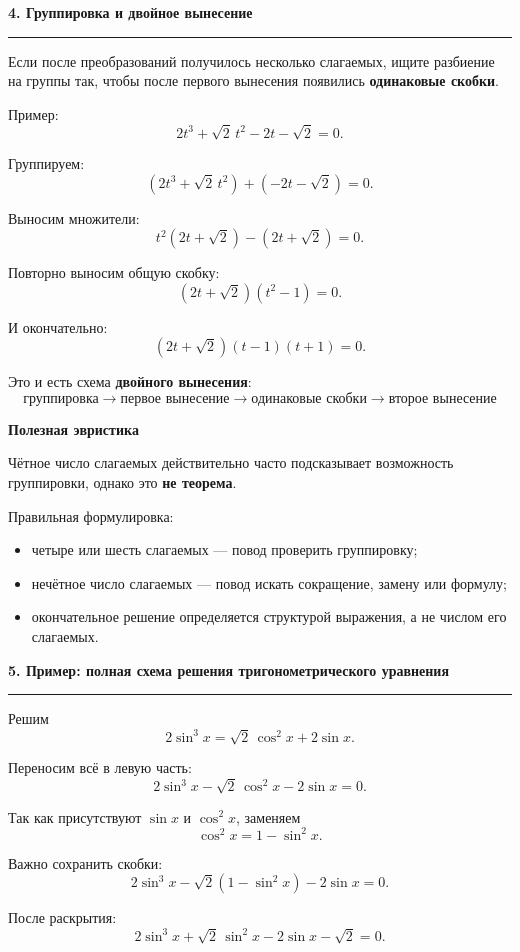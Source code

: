 \documentclass[a4paper,12pt]{article}
\newcommand{\checktitle}[1]{%
    \vspace{0.4em}
    {\Large\bfseries\textcolor{darkaccent}{#1}}\par
    \vspace{0.25em}
    {\color{accent!55}\rule{\linewidth}{0.6pt}}
    \vspace{0.45em}
}
\newcommand{\subcheck}[1]{%
    \vspace{0.25em}
    {\large\bfseries\textcolor{accent}{#1}}\par
    \vspace{0.15em}
}
\newcommand{\important}[1]{\textbf{\textcolor{darkaccent}{#1}}}
\begin{document}
\checktitle{4. Группировка и двойное вынесение}

Если после преобразований получилось несколько слагаемых, ищите разбиение на группы так, чтобы после первого вынесения появились \important{одинаковые скобки}.

Пример:
\[
    2t^3+\sqrt2\,t^2-2t-\sqrt2=0.
\]

Группируем:
\[
    \left(2t^3+\sqrt2\,t^2\right)
    +
    \left(-2t-\sqrt2\right)=0.
\]

Выносим множители:
\[
    t^2(2t+\sqrt2)-(2t+\sqrt2)=0.
\]

Повторно выносим общую скобку:
\[
    (2t+\sqrt2)(t^2-1)=0.
\]

И окончательно:
\[
    (2t+\sqrt2)(t-1)(t+1)=0.
\]

Это и есть схема \important{двойного вынесения}:
\[
\boxed{
\text{группировка}
\to
\text{первое вынесение}
\to
\text{одинаковые скобки}
\to
\text{второе вынесение}
}
\]

\subcheck{Полезная эвристика}

Чётное число слагаемых действительно часто подсказывает возможность группировки, однако это \important{не теорема}.

Правильная формулировка:

\begin{itemize}
    \item четыре или шесть слагаемых --- повод проверить группировку;
    \item нечётное число слагаемых --- повод искать сокращение, замену или формулу;
    \item окончательное решение определяется структурой выражения, а не числом его слагаемых.
\end{itemize}


\checktitle{5. Пример: полная схема решения тригонометрического уравнения}

Решим
\[
    2\sin^3x
    =
    \sqrt2\,\cos^2x+2\sin x.
\]

Переносим всё в левую часть:
\[
    2\sin^3x-\sqrt2\,\cos^2x-2\sin x=0.
\]

Так как присутствуют \(\sin x\) и \(\cos^2x\), заменяем
\[
    \cos^2x=1-\sin^2x.
\]

Важно сохранить скобки:
\[
    2\sin^3x-\sqrt2(1-\sin^2x)-2\sin x=0.
\]

После раскрытия:
\[
    2\sin^3x+\sqrt2\,\sin^2x-2\sin x-\sqrt2=0.
\]
\end{document}
